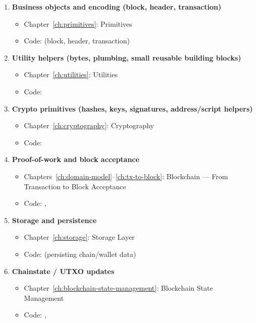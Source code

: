 \begin{enumerate}
  \item \textbf{Business objects and encoding (block, header, transaction)}
    \begin{itemize}
      \item Chapter~\ref{ch:primitives}: Primitives
      \item Code:  (block, header, transaction)
    \end{itemize}

  \item \textbf{Utility helpers (bytes, plumbing, small reusable building blocks)}
    \begin{itemize}
      \item Chapter~\ref{ch:utilities}: Utilities
      \item Code: 
    \end{itemize}

  \item \textbf{Crypto primitives (hashes, keys, signatures, address/script helpers)}
    \begin{itemize}
      \item Chapter~\ref{ch:cryptography}: Cryptography
      \item Code: 
    \end{itemize}

  \item \textbf{Proof-of-work and block acceptance}
    \begin{itemize}
      \item Chapters~\ref{ch:domain-model}--\ref{ch:tx-to-block}: Blockchain --- From Transaction to Block Acceptance
      \item Code: , 
    \end{itemize}

  \item \textbf{Storage and persistence}
    \begin{itemize}
      \item Chapter~\ref{ch:storage}: Storage Layer
      \item Code:  (persisting chain/wallet data)
    \end{itemize}

  \item \textbf{Chainstate / UTXO updates}
    \begin{itemize}
      \item Chapter~\ref{ch:blockchain-state-management}: Blockchain State Management
      \item Code: , 
    \end{itemize}


\end{enumerate}
